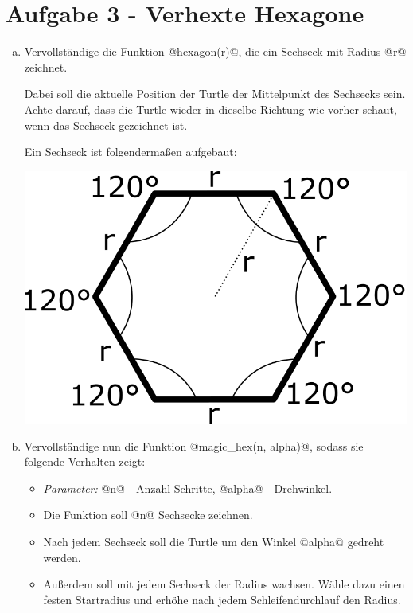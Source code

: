     \section*{Aufgabe 3 - Verhexte Hexagone}
    \begin{enumerate}[a)] 
        \item
        Vervollständige die Funktion @hexagon(r)@, die ein Sechseck mit Radius @r@ zeichnet. 
        
        Dabei soll die aktuelle Position der Turtle der Mittelpunkt des Sechsecks sein.
        Achte darauf, dass die Turtle wieder in dieselbe Richtung wie vorher schaut, wenn das Sechseck gezeichnet ist.
        
        Ein Sechseck ist folgendermaßen aufgebaut:
        \begin{center}
            \includegraphics[scale=0.5]{img/single_hex}
        \end{center}

        \item 
        Vervollständige nun die Funktion @magic_hex(n, alpha)@, sodass sie folgende Verhalten zeigt:
        \begin{itemize}
            \item 
            \textit{Parameter:} @n@ - Anzahl Schritte, @alpha@ - Drehwinkel.
            \item 
            Die Funktion soll @n@ Sechsecke zeichnen. 
            \item  
            Nach jedem Sechseck soll die Turtle um den Winkel @alpha@ gedreht werden. 
            \item  
            Außerdem soll mit jedem Sechseck der Radius wachsen. Wähle dazu einen festen Startradius und erhöhe 
            nach jedem Schleifendurchlauf den Radius.
        \end{itemize}


\end{enumerate}
